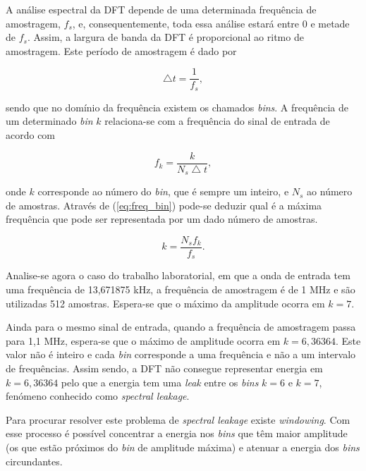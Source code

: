 \documentclass[11pt]{article}
\numberwithin{equation}{section}
\begin{document}
A análise espectral da DFT depende de uma determinada frequência de amostragem, $f_{s}$, e, consequentemente, toda essa análise estará entre $0$ e metade de $f_{s}$. Assim, a largura de banda da DFT é proporcional ao ritmo de amostragem. Este período de amostragem é dado por

\vspace{-3mm}
\begin{equation}
\bigtriangleup t = \frac{1}{f_{s}},
\end{equation}

\vspace{1mm}
sendo que no domínio da frequência existem os chamados \textit{bins}. A frequência de um determinado \textit{bin} $k$ relaciona-se com a frequência do sinal de entrada de acordo com

\vspace{-3mm}
\begin{equation}
f_{k} = \frac{k}{N_{s} \bigtriangleup t},
\label{eq:freq_bin}
\end{equation}

\vspace{1mm}
onde $k$ corresponde ao número do \textit{bin}, que é sempre um inteiro, e $N_{s}$ ao número de amostras. Através de (\ref{eq:freq_bin}) pode-se deduzir qual é a máxima frequência que pode ser representada por um dado número de amostras.

\vspace{-3mm}
\begin{equation}
k = \frac{N_{s} f_{k}}{f_{s}}.
\label{eq:max_bin}
\end{equation}

\vspace{1mm}
Analise-se agora o caso do trabalho laboratorial, em que a onda de entrada tem uma frequência de 13,671875 kHz, a frequência de amostragem é de 1 MHz e são utilizadas 512 amostras. Espera-se que o máximo da amplitude ocorra em $k = 7$.

Ainda para o mesmo sinal de entrada, quando a frequência de amostragem passa para 1,1 MHz, espera-se que o máximo de amplitude ocorra em $k = 6,36364$. Este valor não é inteiro  e cada \textit{bin} corresponde a uma frequência e não a um intervalo de frequências. Assim sendo, a DFT não consegue representar energia em $k = 6,36364$ pelo que a energia tem uma \textit{leak} entre os \textit{bins} $k = 6$ e $k = 7$, fenómeno conhecido como \textit{spectral leakage}.

Para procurar resolver este problema de \textit{spectral leakage} existe \textit{windowing}. Com esse processo é possível concentrar a energia nos \textit{bins} que têm maior amplitude (os que estão próximos do \textit{bin} de amplitude máxima) e atenuar a energia dos \textit{bins} circundantes.
\end{document}
